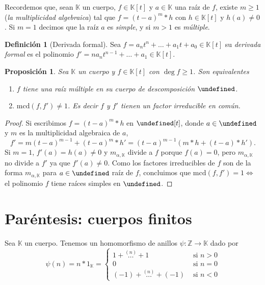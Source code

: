 \documentclass[10pt, spanish]{report}
\newtheorem*{prop}{Proposición}
\theoremstyle{definition}
\newtheorem*{defin}{Definición}
\newcommand{\Z}{\mathbb{Z}}
\newcommand{\K}{\mathbb{K}}
\let\L\undefined
\newcommand{\L}{\mathbb{L}}
\renewcommand{\geq}{\geqslant}
\newcommand{\fecha}[1]{\marginpar{\underline{#1}}}
\begin{document}
\fecha{11/03}

Recordemos que, sean $\K$ un cuerpo, $f\in\K[t]$ y $a\in\K$ una raíz de $f$,
existe $m\geq1$ (\textit{la multiplicidad algebraica}) tal que $f=(t-a)^m*h$ con
$h\in\K[t]$ y $h(a)\neq0$. Si $m=1$ decimos que la raíz $a$ es \textit{simple},
y si $m>1$ es \textit{múltiple}.

\begin{defin}[Derivada formal]
    Sea $f=a_nt^n+\ldots+a_1t+a_0\in\K[t]$ su \textit{derivada formal} es el
    polinomio $f'=na_nt^{n-1}+\ldots+a_1\in\K[t]$.
\end{defin}

\begin{prop}
    Sea $\K$ un cuerpo y $f\in\K[t]$ con $\deg{f}\geq1$. Son equivalentes
    \begin{enumerate}
        \item $f$ tiene una raíz múltiple en su cuerpo de descomposición $\L$.
        \item $\text{mcd}(f,f')\neq 1$. Es decir $f$ y $f'$ tienen un factor
            irreducible en común.
    \end{enumerate}
\end{prop}

\begin{proof}
        Si escribimos $f=(t-a)^m*h$ en $\L[t]$, donde
            $a\in\L$ y $m$ es la multiplicidad algebraica de $a$,
            \[f'=m(t-a)^{m-1}+(t-a)^m*h'=(t-a)^{m-1}(m*h+(t-a)*h').\]
            Si $m=1$, $f'(a)=h(a)\neq 0$ y $m_{\alpha,\K}$ divide a
            $f$ porque $f(a)=0$, pero $m_{\alpha,\K}$ no divide a $f'$
            ya que $f'(a)\neq 0$. Como los factores irreducibles de $f$ son
            de la forma $m_{\alpha,\K}$ para $a\in\L$ raíz de $f$, concluimos
            que $\text{mcd}(f,f')=1 \Leftrightarrow $ el polinomio $f$ tiene
            raíces simples en $\L$.
\end{proof}

\section{Paréntesis: cuerpos finitos}

Sea $\K$ un cuerpo. Tenemos un homomorfismo de anillos $\psi:\Z\to\K$ dado por
\[\psi(n)=n*1_\K=
    \begin{cases}
        1+\stackrel{(n)}{\ldots}+1& \text{ si } n>0\\
        0& \text{ si } n=0\\
        (-1)+\stackrel{(n)}{\ldots}+(-1)& \text{ si } n<0
    \end{cases}
\]
\end{document}
